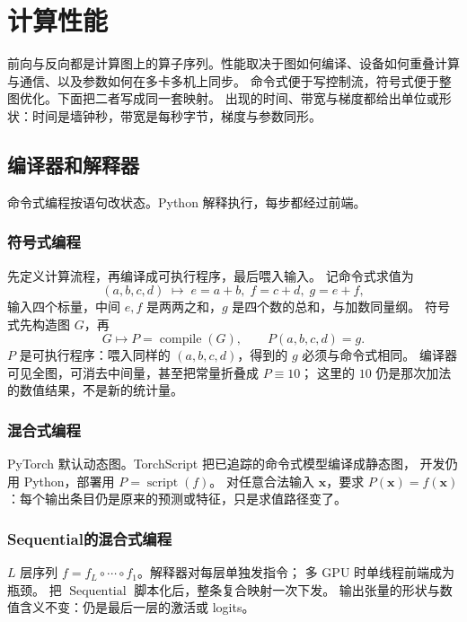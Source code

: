 \chapter{计算性能}

前向与反向都是计算图上的算子序列。性能取决于图如何编译、设备如何重叠计算与通信、以及参数如何在多卡多机上同步。
命令式便于写控制流，符号式便于整图优化。下面把二者写成同一套映射。
出现的时间、带宽与梯度都给出单位或形状：时间是墙钟秒，带宽是每秒字节，梯度与参数同形。

\section{编译器和解释器}



命令式编程按语句改状态。Python 解释执行，每步都经过前端。

\subsection{符号式编程}

先定义计算流程，再编译成可执行程序，最后喂入输入。
记命令式求值为
\[
(a,b,c,d)
\;\longmapsto\;
e=a+b,\; f=c+d,\; g=e+f,
\]
输入四个标量，中间 $e,f$ 是两两之和，$g$ 是四个数的总和，与加数同量纲。
符号式先构造图 $G$，再
\[
G\longmapsto P=\operatorname{compile}(G),\qquad
P(a,b,c,d)=g.
\]
$P$ 是可执行程序：喂入同样的 $(a,b,c,d)$，得到的 $g$ 必须与命令式相同。
编译器可见全图，可消去中间量，甚至把常量折叠成 $P\equiv 10$；
这里的 $10$ 仍是那次加法的数值结果，不是新的统计量。

\subsection{混合式编程}

PyTorch 默认动态图。TorchScript 把已追踪的命令式模型编译成静态图，
开发仍用 Python，部署用 $P=\operatorname{script}(f)$。
对任意合法输入 $\bm{x}$，要求 $P(\bm{x})=f(\bm{x})$：每个输出条目仍是原来的预测或特征，只是求值路径变了。

\subsection{Sequential的混合式编程}

$L$ 层序列 $f=f_L\circ\cdots\circ f_1$。解释器对每层单独发指令；
多 GPU 时单线程前端成为瓶颈。
把 $\operatorname{Sequential}$ 脚本化后，整条复合映射一次下发。
输出张量的形状与数值含义不变：仍是最后一层的激活或 logits。

